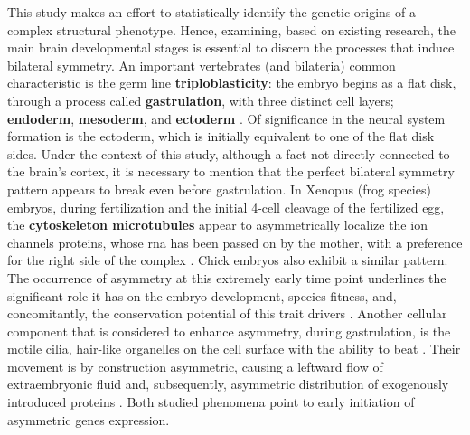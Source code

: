This study makes an effort to statistically identify the genetic origins of a complex structural phenotype. Hence, examining, based on existing research, the main brain developmental stages is essential to discern the processes that induce bilateral symmetry. An important vertebrates (and bilateria) common characteristic is the germ line \textbf{triploblasticity}: the embryo begins as a flat disk, through a process called \textbf{gastrulation}, with three distinct cell layers; \textbf{endoderm}, \textbf{mesoderm}, and \textbf{ectoderm} \cite{F.Bear2016a}.  Of significance in the neural system formation is the ectoderm, which is initially equivalent to one of the flat disk sides. Under the context of this study, although a fact not directly connected to the brain's cortex, it is necessary to mention that the perfect bilateral symmetry pattern appears to break even before gastrulation. In Xenopus (frog species) embryos, during fertilization and the initial 4-cell cleavage of the fertilized egg, the \textbf{cytoskeleton microtubules} appear to asymmetrically localize the ion channels proteins, whose \acs{rna} has been passed on by the mother, with a preference for the right side of the complex \cite{Aw2008}. Chick embryos also exhibit a similar pattern. The occurrence of asymmetry at this extremely early time point underlines the significant role it has on the embryo development, species fitness, and, concomitantly, the conservation potential of this trait drivers \cite{Aw2009}. Another cellular component that is considered to enhance asymmetry, during gastrulation, is the motile cilia, hair-like organelles on the cell surface with the ability to beat \cite{Grimes2017}. Their movement is by construction asymmetric, causing a leftward flow of extraembryonic fluid and, subsequently, asymmetric distribution of exogenously introduced proteins \cite{Okada2005}. Both studied phenomena point to early initiation of asymmetric genes expression.

